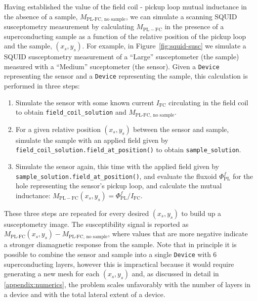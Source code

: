 \documentclass[final,3p,times,twocolumn]{elsarticle}
\newcommand{\inline}[1]{\texttt{#1}\xspace}
\begin{document}
Having established the value of the field coil - pickup loop mutual inductance in the absence of a sample, $M_\text{PL-FC, no sample}$, we can simulate a scanning SQUID susceptometry measurement by calculating $M_\mathrm{PL-FC}$ in the presence of a superconducting sample as a function of the relative position of the pickup loop and the sample, $(x_s, y_s)$. For example, in Figure~\ref{fig:squid-susc} we simulate a SQUID susceptometry measurement of a ``Large'' susceptometer (the sample) measured with a ``Medium'' suceptometer (the sensor). Given a \inline{Device} representing the sensor and a \inline{Device} representing the sample, this calculation is performed in three steps:
\begin{enumerate}
    \item{Simulate the sensor with some known current $I_\mathrm{FC}$ circulating in the field coil to obtain \inline{field_coil_solution} and $M_\text{PL-FC, no sample}$.}
    \item{For a given relative position $(x_s, y_s)$ between the sensor and sample, simulate the sample with an applied field given by \inline{field_coil_solution.field_at_position()} to obtain \inline{sample_solution}.}
    \item{Simulate the sensor again, this time with the applied field given by \inline{sample_solution.field_at_position()}, and evaluate the fluxoid $\Phi^f_\mathrm{PL}$ for the hole representing the sensor's pickup loop, and calculate the mutual inductance: $M_\mathrm{PL-FC}(x_s, y_s)=\Phi^f_\mathrm{PL} / I_\mathrm{FC}$.}
\end{enumerate}
These three steps are repeated for every desired $(x_s, y_s)$ to build up a susceptometry image. The susceptibility signal is reported as $M_\text{PL-FC}(x_s, y_s) - M_\text{PL-FC, no sample}$, where values that are more negative indicate a stronger diamagnetic response from the sample. Note that in principle it is possible to combine the sensor and sample into a single \inline{Device} with 6 superconducting layers, however this is impractical because it would require generating a new mesh for each $(x_s, y_s)$ and, as discussed in detail in \ref{appendix:numerics}, the problem scales unfavorably with the number of layers in a device and with the total lateral extent of a device.
\end{document}
